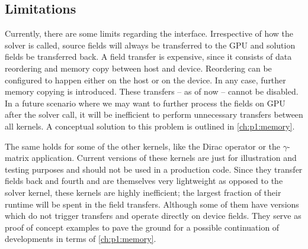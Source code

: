
\subsection{Limitations}

Currently, there are some limits regarding the interface.
Irrespective of how the solver is called, source fields will always be transferred to the GPU and solution fields be transferred back.
A field transfer is expensive, since it consists of data reordering and memory copy between host and device.
Reordering can be configured to happen either on the host or on the device.
In any case, further memory copying is introduced.
These transfers -- as of now -- cannot be disabled.
In a future scenario where we may want to further process the fields on GPU after the solver call, it will be inefficient to perform unnecessary transfers between all kernels.
A conceptual solution to this problem is outlined in \cref{ch:p1:memory}.

The same holds for some of the other kernels, like the Dirac operator or the $\gamma$-matrix application.
Current versions of these kernels are just for illustration and testing purposes and should not be used in a production code.
Since they transfer fields back and fourth and are themselves very lightweight as opposed to the solver kernel, these kernels are highly inefficient; the largest fraction of their runtime will be spent in the field transfers.
Although some of them have versions which do not trigger transfers and operate directly on device fields.
They serve as proof of concept examples to pave the ground for a possible continuation of developments in terms of \cref{ch:p1:memory}.

